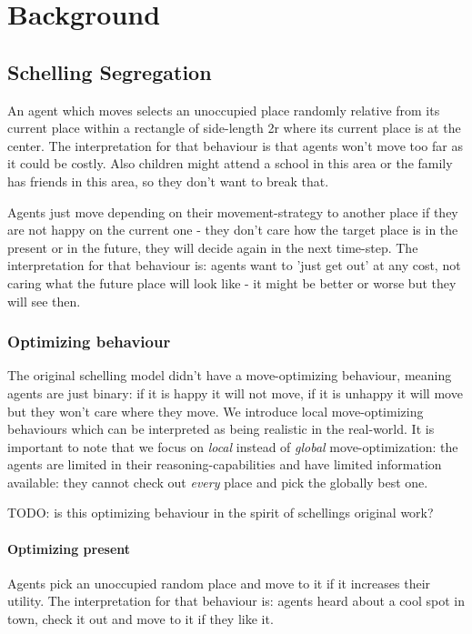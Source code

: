 \section{Background}

\subsection{Schelling Segregation}
\cite{schelling_dynamic_1971}

An agent which moves selects an unoccupied place randomly relative from its current place within a rectangle of side-length 2r where its current place is at the center. The interpretation for that behaviour is that agents won't move too far as it could be costly. Also children might attend a school in this area or the family has friends in this area, so they don't want to break that.

Agents just move depending on their movement-strategy to another place if they are not happy on the current one - they don't care how the target place is in the present or in the future, they will decide again in the next time-step. The interpretation for that behaviour is: agents want to 'just get out' at any cost, not caring what the future place will look like - it might be better or worse but they will see then.


\subsubsection{Optimizing behaviour}
The original schelling model didn't have a move-optimizing behaviour, meaning agents are just binary: if it is happy it will not move, if it is unhappy it will move but they won't care where they move. We introduce local move-optimizing behaviours which can be interpreted as being realistic in the real-world. It is important to note that we focus on \textit{local} instead of \textit{global} move-optimization: the agents are limited in their reasoning-capabilities and have limited information available: they cannot check out \textit{every} place and pick the globally best one.

TODO: is this optimizing behaviour in the spirit of schellings original work? 

\paragraph{Optimizing present} Agents pick an unoccupied random place and move to it if it increases their utility. The interpretation for that behaviour is: agents heard about a cool spot in town, check it out and move to it if they like it.


